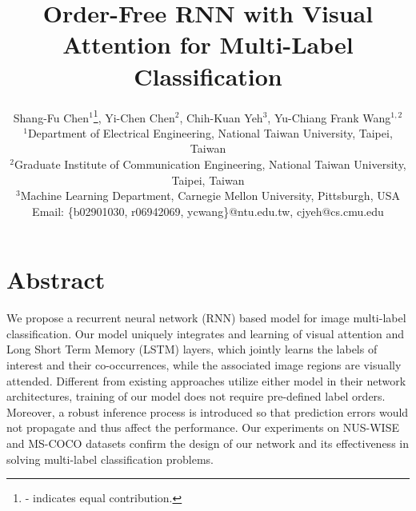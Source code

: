 \documentclass[letterpaper]{article} %
\begin{document}
%
\title{Order-Free RNN with Visual Attention
for Multi-Label Classification}
\author{Shang-Fu Chen$^1$\thanks{ - indicates equal contribution.}, Yi-Chen Chen$^2$\footnotemark[1], Chih-Kuan Yeh$^3$, Yu-Chiang Frank Wang$^{1,2}$\\
$^1$Department of Electrical Engineering, National Taiwan University, Taipei, Taiwan\\
$^2$Graduate Institute of Communication Engineering, National Taiwan University, Taipei, Taiwan\\
$^3$Machine Learning Department, Carnegie Mellon University, Pittsburgh, USA\\
Email: \{b02901030, r06942069, ycwang\}@ntu.edu.tw, cjyeh@cs.cmu.edu
}
\maketitle
\def \D {\textbf{D}} %
\def \R {\mathbb{R}}

\def \X {\textbf{X}} %
\def \Y {\textbf{Y}} %

\def \x {\textbf{x}} %
\def \y {\textbf{y}} %
\def \hx {\hat{\x}} %
\def \hy {\hat{\y}} %
\def \tl {l} %
\def \ty {\tilde{\y}} %


\def \c {c} %
\def \C {\mathcal{C}} %
\def \pC {\C'}

\def \f {\mathbf{M}} %
\def \fcnn {\f_{map}}
\def \fatt {\f_{att}}
\def \flstm {\f_{pred}}

\def \I {\mathbf{I}} %
\def \V {\mathbf{V}} %
\def \z {\mathbf{z}} %
\def \p {\mathbf{p}} %
\def \h {\mathbf{h}} %

\def \v {\mathbf{v}} %
\def \one {\mathbf{1}}

\def \L {\mathbf{L}} %

\section{Abstract}
\label{sec:abstract}
We propose a recurrent neural network (RNN) based model for image multi-label classification. Our model uniquely integrates and learning of visual attention and Long Short Term Memory (LSTM) layers, which jointly learns the labels of interest and their co-occurrences, while the associated image regions are visually attended. Different from existing approaches utilize either model in their network architectures, training of our model does not require pre-defined label orders. Moreover, a robust inference process is introduced so that prediction errors would not propagate and thus affect the performance. Our experiments on NUS-WISE and MS-COCO datasets confirm the design of our network and its effectiveness in solving multi-label classification problems.
\end{document}

